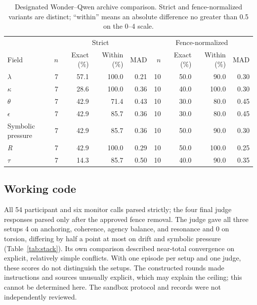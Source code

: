 \documentclass[11pt]{article}
\begin{document}
\begin{table}[htbp]
\centering\small
\caption{Designated Wonder--Qwen archive comparison. Strict and fence-normalized variants are distinct; ``within'' means an absolute difference no greater than 0.5 on the 0--4 scale.}
\label{tab:agreement}
{\setlength{\tabcolsep}{4pt}\footnotesize
\begin{tabular}{@{}lrrrr@{\quad}rrrr@{}}
\toprule
 & \multicolumn{4}{c}{Strict} & \multicolumn{4}{c}{Fence-normalized} \\
Field & $n$ & Exact (\%) & Within (\%) & MAD & $n$ & Exact (\%) & Within (\%) & MAD \\
\midrule
$\lambda$ & 7 & 57.1 & 100.0 & 0.21 & 10 & 50.0 & 90.0 & 0.30 \\
$\kappa$ & 7 & 28.6 & 100.0 & 0.36 & 10 & 40.0 & 100.0 & 0.30 \\
$\theta$ & 7 & 42.9 & 71.4 & 0.43 & 10 & 30.0 & 80.0 & 0.45 \\
$\epsilon$ & 7 & 42.9 & 85.7 & 0.36 & 10 & 30.0 & 80.0 & 0.45 \\
Symbolic pressure & 7 & 42.9 & 85.7 & 0.36 & 10 & 50.0 & 90.0 & 0.30 \\
\textit{R} & 7 & 42.9 & 100.0 & 0.29 & 10 & 50.0 & 100.0 & 0.25 \\
$\tau$ & 7 & 14.3 & 85.7 & 0.50 & 10 & 40.0 & 90.0 & 0.35 \\
\bottomrule
\end{tabular}}
\end{table}

\subsection{Working code}
All 54 participant and six monitor calls parsed strictly; the four final judge responses parsed only after the approved fence removal. The judge gave all three setups 4 on anchoring, coherence, agency balance, and resonance and 0 on torsion, differing by half a point at most on drift and symbolic pressure (Table~\ref{tab:stack}). Its own comparison described near-total convergence on explicit, relatively simple conflicts. With one episode per setup and one judge, these scores do not distinguish the setups. The constructed rounds made instructions and sources unusually explicit, which may explain the ceiling; this cannot be determined here. The sandbox protocol and records were not independently reviewed.
\end{document}

